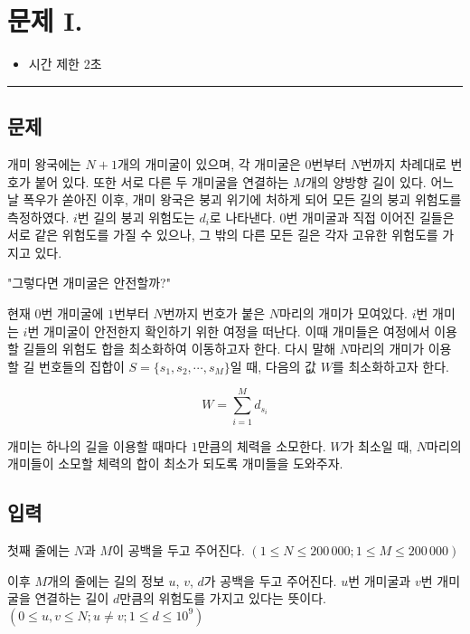 \newpage
\section*{{\Large 문제 I.} }

\begin{itemize}
    \item 시간 제한 \tabto{2cm} 2초
\end{itemize}

\hrule

\subsection*{문제}

개미 왕국에는 $N+1$개의 개미굴이 있으며, 각 개미굴은 $0$번부터 $N$번까지 차례대로 번호가 붙어 있다. 또한 서로 다른 두 개미굴을 연결하는 $M$개의 양방향 길이 있다. 어느 날 폭우가 쏟아진 이후, 개미 왕국은 붕괴 위기에 처하게 되어 모든 길의 붕괴 위험도를 측정하였다. $i$번 길의 붕괴 위험도는 $d_{i}$로 나타낸다. $0$번 개미굴과 직접 이어진 길들은 서로 같은 위험도를 가질 수 있으나, 그 밖의 다른 모든 길은 각자 고유한 위험도를 가지고 있다.

\begin{center}
    "그렇다면 개미굴은 안전할까?"
\end{center}

현재 $0$번 개미굴에 $1$번부터 $N$번까지 번호가 붙은 $N$마리의 개미가 모여있다. $i$번 개미는 $i$번 개미굴이 안전한지 확인하기 위한 여정을 떠난다. 이때 개미들은 여정에서 이용할 길들의 위험도 합을 최소화하여 이동하고자 한다. 다시 말해 $N$마리의 개미가 이용할 길 번호들의 집합이 $S=\{s_{1}, s_{2},\cdots, s_{M}\}$일 때, 다음의 값 $W$를 최소화하고자 한다.

$$
W=\sum_{i=1}^{M}{d_{s_{i}}}
$$

개미는 하나의 길을 이용할 때마다 $1$만큼의 체력을 소모한다. $W$가 최소일 때, $N$마리의 개미들이 소모할 체력의 합이 최소가 되도록 개미들을 도와주자.

\subsection*{입력}

첫째 줄에는 $N$과 $M$이 공백을 두고 주어진다. $(1\leq N \leq 200\,000; 1 \leq M \leq 200\,000)$

이후 $M$개의 줄에는 길의 정보 $u$, $v$, $d$가 공백을 두고 주어진다. $u$번 개미굴과 $v$번 개미굴을 연결하는 길이 $d$만큼의 위험도를 가지고 있다는 뜻이다. $(0\leq u,v \leq N; u \neq v; 1\leq d \leq 10^{9})$


